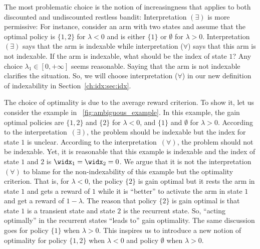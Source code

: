 The most problematic choice is the notion of increasingness that applies to both discounted and undiscounted restless bandit: Interpretation $(\exists)$ is more permissive: For instance, consider an arm with two states and assume that the optimal policy is $\{1,2\}$ for $\lambda<0$ and is either $\{1\}$ or $\emptyset$ for $\lambda>0$.
Interpretation $(\exists)$ says that the arm is indexable while interpretation ($\forall$) says that this arm is not indexable.
If the arm is indexable, what should be the index of state $1$?
Any choice $\lambda_1\in[0,+\infty]$ seems reasonable.
Saying that the arm is not indexable clarifies the situation.
So, we will choose interpretation ($\forall$) in our new definition of indexability in Section~\ref{ch:idx:sec:idx}.

The choice of optimality is due to the average reward criterion.
To show it, let us consider the example in \figurename~\ref{fig:ambiguous_example}.
In this example, the gain optimal policies are $\{1,2\}$ and $\{2\}$ for $\lambda<0$, and $\{1\}$ and $\emptyset$ for $\lambda>0$.
According to the interpretation~$(\exists)$, the problem should be indexable but the index for state $1$ is unclear.
According to the interpretation~$(\forall)$, the problem should not be indexable.
Yet, it is reasonable that this example is indexable and the index of state $1$ and $2$ is $\widx_1=\widx_2=0$.
We argue that it is not the interpretation~$(\forall)$ to blame for the non-indexability of this example but the optimality criterion.
That is, for $\lambda<0$, the policy $\{2\}$ is gain optimal but it rests the arm in state $1$ and gets a reward of $1$ while it is ``better'' to activate the arm in state $1$ and get a reward of $1-\lambda$. 
The reason that policy $\{2\}$ is gain optimal is that state $1$ is a transient state and state $2$ is the recurrent state.
So, ``acting optimally'' in the recurrent states ``leads to'' gain optimality.
The same discussion goes for policy $\{1\}$ when $\lambda>0$.
This inspires us to introduce a new notion of optimality for policy $\{1,2\}$ when $\lambda<0$ and policy $\emptyset$ when $\lambda>0$.

